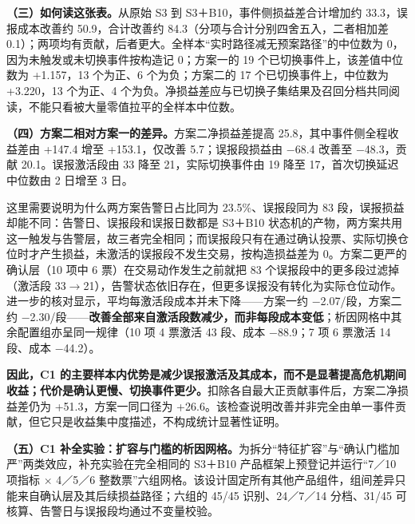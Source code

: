 \documentclass[12pt,a4paper]{ctexart}
\begin{document}
\textbf{（三）如何读这张表。}从原始 S3 到 S3＋B10，事件侧损益差合计增加约 33.3，误报成本改善约 50.9，合计改善约 84.3（分项与合计分别四舍五入，二者相加差 0.1）；两项均有贡献，后者更大。全样本“实时路径减无预案路径”的中位数为 0，因为未触发或未切换事件按构造记 0；方案一的 19 个已切换事件上，该差值中位数为 +1.157，13 个为正、6 个为负；方案二的 17 个已切换事件上，中位数为 +3.220，13 个为正、4 个为负。净损益差应与已切换子集结果及召回分档共同阅读，不能只看被大量零值拉平的全样本中位数。\par
\textbf{（四）方案二相对方案一的差异。}方案二净损益差提高 25.8，其中事件侧全程收益差由 +147.4 增至 +153.1，仅改善 5.7；误报段损益由 \(-\)68.4 改善至 \(-\)48.3，贡献 20.1。误报激活段由 33 降至 21，实际切换事件由 19 降至 17，首次切换延迟中位数由 2 日增至 3 日。\par
这里需要说明为什么两方案告警日占比同为 23.5\%、误报段同为 83 段，误报损益却能不同：告警日、误报段和误报日数都是 S3＋B10 状态机的产物，两方案共用这一触发与告警层，故三者完全相同；而误报段只有在通过确认投票、实际切换仓位时才产生损益，未激活的误报段不发生交易，按构造损益差为 0。方案二更严的确认层（10 项中 6 票）在交易动作发生之前就把 83 个误报段中的更多段过滤掉（激活段 33\(\rightarrow\)21），告警状态依旧存在，但更多误报没有转化为实际仓位动作。进一步的核对显示，平均每激活段成本并未下降——方案一约 \(-\)2.07/段，方案二约 \(-\)2.30/段——\textbf{改善全部来自激活段数减少，而非每段成本变低}；析因网格中其余配置组亦呈同一规律（10 项 4 票激活 43 段、成本 \(-\)88.9；7 项 6 票激活 14 段、成本 \(-\)44.2）。\par
\textbf{因此，C1 的主要样本内优势是减少误报激活及其成本，而不是显著提高危机期间收益；代价是确认更慢、切换事件更少。}扣除各自最大正贡献事件后，方案二净损益差仍为 +51.3，方案一同口径为 +26.6。该检查说明改善并非完全由单一事件贡献，但它只是收益集中度描述，不构成统计显著性证明。\par
\textbf{（五）C1 补全实验：扩容与门槛的析因网格。}为拆分“特征扩容”与“确认门槛加严”两类效应，补充实验在完全相同的 S3＋B10 产品框架上预登记并运行“7／10 项指标 \(\times\) 4／5／6 整数票”六组网格。该设计固定所有其他产品组件，组间差异只能来自确认层及其后续损益路径；六组的 45/45 识别、24／7／14 分档、31/45 可核算、告警日与误报段均通过不变量校验。\par
\end{document}
